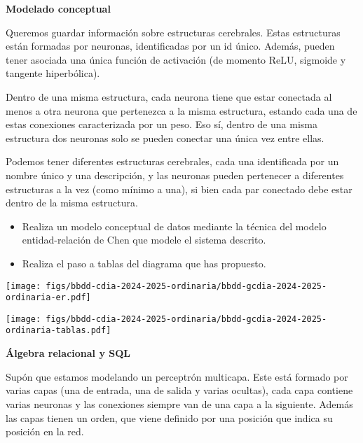 \documentclass[
    12pt,
    a4paper,
    addpoints,
    answers,
    convocatoria=ord,
    titulacion=CD,
    curso=2024/2025,
]{db-exam}
\begin{document}
\begin{questions}

\question[3] \textbf{Modelado conceptual}

Queremos guardar información sobre estructuras cerebrales. Estas estructuras están formadas por neuronas, identificadas por un id único. Además, pueden tener asociada una única función de activación (de momento ReLU, sigmoide y tangente hiperbólica).

Dentro de una misma estructura, cada neurona tiene que estar conectada al menos a otra neurona que pertenezca a la misma estructura, estando cada una de estas conexiones caracterizada por un peso. Eso sí, dentro de una misma estructura dos neuronas solo se pueden conectar una única vez entre ellas.

Podemos tener diferentes estructuras cerebrales, cada una identificada por un nombre único y una descripción, y las neuronas pueden pertenecer a diferentes estructuras a la vez (como mínimo a una), si bien cada par conectado debe estar dentro de la misma estructura.

\begin{itemize}
    \item Realiza un modelo conceptual de datos mediante la técnica del modelo entidad-relación de Chen que modele el sistema descrito.
    \item Realiza el paso a tablas del diagrama que has propuesto.
\end{itemize}

\begin{solution}

\begin{center}
    \texttt{[image: figs/bbdd-cdia-2024-2025-ordinaria/bbdd-gcdia-2024-2025-ordinaria-er.pdf]}
\end{center}

\begin{center}
    \texttt{[image: figs/bbdd-cdia-2024-2025-ordinaria/bbdd-gcdia-2024-2025-ordinaria-tablas.pdf]}
\end{center}

\end{solution}

\question[5] \textbf{Álgebra relacional y SQL}

Supón que estamos modelando un perceptrón multicapa. Este está formado por varias capas (una de entrada, una de salida y varias ocultas), cada capa contiene varias neuronas y las conexiones siempre van de una capa a la siguiente. Además las capas tienen un orden, que viene definido por una posición que indica su posición en la red.


\end{questions}
\end{document}
